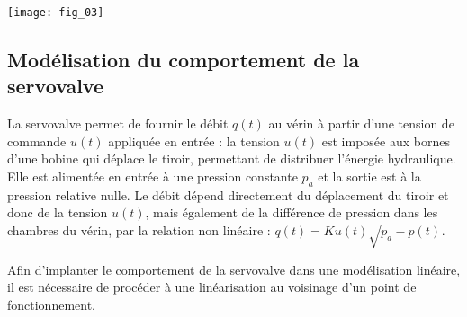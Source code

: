 %
%
%
%
%
%
%
%
%
%
%
%
%

\ifprof
\begin{corrige}
\end{corrige}
\else
\fi

\begin{marginfigure}
\centering
\texttt{[image: fig\_03]}
\end{marginfigure}



\subsection*{Modélisation du comportement de la servovalve}
La servovalve permet de fournir le débit $q(t )$ au vérin à partir d’une tension de commande
$u(t )$ appliquée en entrée : la tension $u(t )$ est imposée aux bornes d’une bobine qui déplace le
tiroir, permettant de distribuer l’énergie hydraulique. Elle est alimentée en entrée à une pression
constante $p_a$ et la sortie est à la pression relative nulle.
Le débit dépend directement du déplacement du tiroir et donc de la tension $u(t )$, mais également
de la différence de pression dans les chambres du vérin, par la relation non linéaire :
$q(t ) = Ku(t) \sqrt{p_a-p(t)}$.
 
Afin d’implanter le comportement de la servovalve dans une modélisation linéaire, il est nécessaire
de procéder à une linéarisation au voisinage d’un point de fonctionnement.

